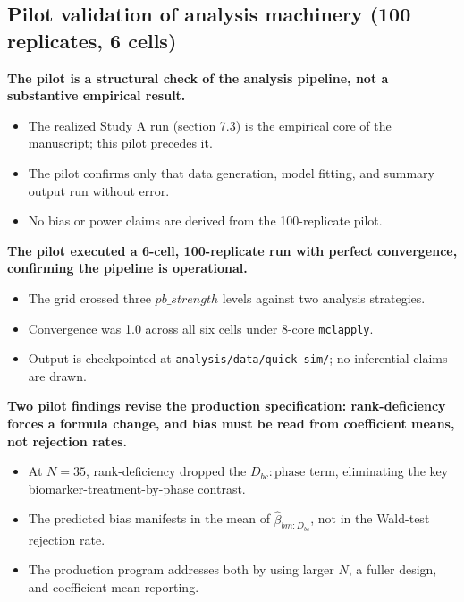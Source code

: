 \documentclass[
  11pt,
]{article}
\begin{document}
\subsection{Pilot validation of analysis machinery (100 replicates, 6 cells)}\label{pilot-validation-of-analysis-machinery-100-replicates-6-cells}

\textbf{The pilot is a structural check of the analysis pipeline, not a substantive empirical result.}

\begin{itemize}\setlength{\itemsep}{2pt}\setlength{\parskip}{0pt}
\item The realized Study A run (section 7.3) is the empirical core of the manuscript; this pilot precedes it.
\item The pilot confirms only that data generation, model fitting, and summary output run without error.
\item No bias or power claims are derived from the 100-replicate pilot.
\end{itemize}

\textbf{The pilot executed a 6-cell, 100-replicate run with perfect convergence, confirming the pipeline is operational.}

\begin{itemize}\setlength{\itemsep}{2pt}\setlength{\parskip}{0pt}
\item The grid crossed three $pb\_strength$ levels against two analysis strategies.
\item Convergence was 1.0 across all six cells under 8-core \texttt{mclapply}.
\item Output is checkpointed at \texttt{analysis/data/quick-sim/}; no inferential claims are drawn.
\end{itemize}

\textbf{Two pilot findings revise the production specification: rank-deficiency forces a formula change, and bias must be read from coefficient means, not rejection rates.}

\begin{itemize}\setlength{\itemsep}{2pt}\setlength{\parskip}{0pt}
\item At $N = 35$, rank-deficiency dropped the $D_{bc}{:}\text{phase}$ term, eliminating the key biomarker-treatment-by-phase contrast.
\item The predicted bias manifests in the mean of $\hat\beta_{bm:D_{bc}}$, not in the Wald-test rejection rate.
\item The production program addresses both by using larger $N$, a fuller design, and coefficient-mean reporting.
\end{itemize}
\end{document}
